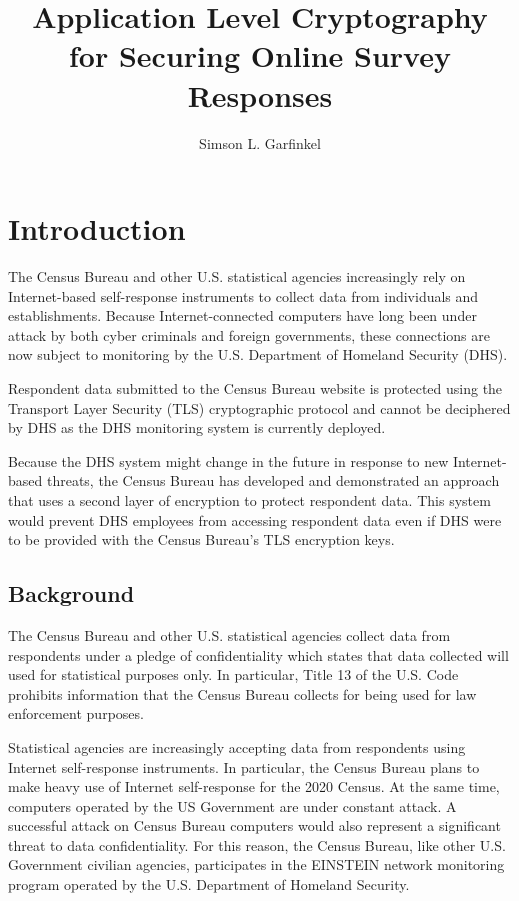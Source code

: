 \documentclass[fleqn,10pt]{wlscirep}
\title{Application Level Cryptography for Securing Online Survey Responses}
\author{Simson L. Garfinkel}
\begin{document}
\maketitle

\section{Introduction}

The Census Bureau and other U.S. statistical agencies increasingly
rely on Internet-based self-response instruments to collect
data from individuals and establishments. Because Internet-connected
computers have long been under attack by both cyber criminals and
foreign governments\cite{dick-testimony}, these connections are now
subject to monitoring by the U.S. Department of Homeland
Security (DHS).

Respondent data submitted to the Census Bureau website is protected
using the Transport Layer Security (TLS)\cite{rfc8446} cryptographic
protocol and cannot be deciphered by DHS as the DHS monitoring system
is currently deployed.

Because the DHS system might change in the future in response to
new Internet-based threats, the Census Bureau has developed and demonstrated an
approach that uses a second layer of encryption to protect respondent
data. This system would prevent DHS employees from accessing
respondent data even if DHS were to be provided with the Census
Bureau's TLS encryption keys.

\subsection{Background}

The Census Bureau and other U.S. statistical agencies collect
data from respondents under a pledge of confidentiality which states
that data collected will used for statistical purposes
only. In particular, Title 13 of the U.S. Code prohibits information
that the Census Bureau collects for being used for law enforcement
purposes.

Statistical agencies are increasingly accepting data from respondents
using Internet self-response instruments. In particular, the Census
Bureau plans to make heavy use of Internet self-response for the 2020
Census.\cite{pennington2016} 
At the same time, computers operated by the US Government are under
constant attack. A successful attack on Census Bureau computers would
also represent a significant threat to data confidentiality. For this
reason, the Census Bureau, like other U.S. Government civilian
agencies, participates in the EINSTEIN network monitoring program
operated by the U.S. Department of Homeland Security.\cite{thompson-feb2017}
\end{document}
